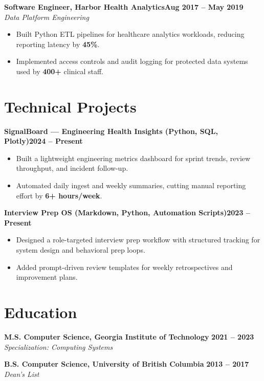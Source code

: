 \documentclass[10pt]{article}
\newcommand{\role}[3]{%
  \textbf{#1}\hfill \textbf{#2}\\
  \textit{#3}\vspace{0pt}
}
\newcommand{\project}[2]{%
  \textbf{#1}\hfill \textbf{#2}\vspace{0pt}
}
\begin{document}
\role{Software Engineer, Harbor Health Analytics}{Aug 2017 -- May 2019}{Data Platform Engineering}
\begin{itemize}
  \item Built Python ETL pipelines for healthcare analytics workloads, reducing reporting latency by \textbf{45\%}.
  \item Implemented access controls and audit logging for protected data systems used by \textbf{400+} clinical staff.
\end{itemize}

\section*{Technical Projects}

\project{SignalBoard --- Engineering Health Insights (Python, SQL, Plotly)}{2024 -- Present}
\begin{itemize}
  \item Built a lightweight engineering metrics dashboard for sprint trends, review throughput, and incident follow-up.
  \item Automated daily ingest and weekly summaries, cutting manual reporting effort by \textbf{6+ hours/week}.
\end{itemize}

\project{Interview Prep OS (Markdown, Python, Automation Scripts)}{2023 -- Present}
\begin{itemize}
  \item Designed a role-targeted interview prep workflow with structured tracking for system design and behavioral prep loops.
  \item Added prompt-driven review templates for weekly retrospectives and improvement plans.
\end{itemize}

\section*{Education}

\textbf{M.S. Computer Science, Georgia Institute of Technology} \hfill \textbf{2021 -- 2023}\\
\textit{Specialization: Computing Systems}

\textbf{B.S. Computer Science, University of British Columbia} \hfill \textbf{2013 -- 2017}\\
\textit{Dean's List}
\end{document}
